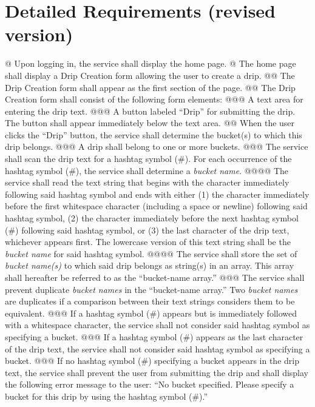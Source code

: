 \documentclass{article}
\begin{document}
\section*{Detailed Requirements (revised version)}

\begin{easylist}[articletoc]
@ Upon logging in, the service shall display the home page.
@ The home page shall display a Drip Creation form allowing the user to create a drip.
@@ The Drip Creation form shall appear as the first section of the page.
@@ The Drip Creation form shall consist of the following form elements:
@@@ A text area for entering the drip text.
@@@ A button labeled ``Drip'' for submitting the drip. The button shall appear immediately below the text area.
@@ \label{submit-drip}When the user clicks the ``Drip'' button, the service shall determine the bucket(s) to which this drip belongs.
@@@ A drip shall belong to one or more buckets.
@@@ The service shall scan the drip text for a hashtag symbol (\#). For each occurrence of the hashtag symbol (\#), the service shall determine a \textit{bucket name}.
@@@@ The service shall read the text string that begins with the character immediately following said hashtag symbol and ends with either (1) the character immediately before the first whitespace character (including a space or newline) following said hashtag symbol, (2) the character immediately before the next hashtag symbol (\#) following said hashtag symbol, or (3) the last character of the drip text, whichever appears first. The lowercase version of this text string shall be the \textit{bucket name} for said hashtag symbol.
@@@@ \label{bucket-name-array}The service shall store the set of \textit{bucket name(s)} to which said drip belongs as string(s) in an array. This array shall hereafter be referred to as the ``bucket-name array.''
@@@ The service shall prevent duplicate \textit{bucket names} in the ``bucket-name array.'' Two \textit{bucket names} are duplicates if a comparison between their text strings considers them to be equivalent.
@@@ If a hashtag symbol (\#) appears but is immediately followed with a whitespace character, the service shall not consider said hashtag symbol as specifying a bucket.
@@@ If a hashtag symbol (\#) appears as the last character of the drip text, the service shall not consider said hashtag symbol as specifying a bucket.
@@@ \label{no-bucket-error}If no hashtag symbol (\#) specifying a bucket appears in the drip text, the service shall prevent the user from submitting the drip and shall display the following error message to the user: ``No bucket specified. Please specify a bucket for this drip by using the hashtag symbol (\#).''

\end{easylist}
\end{document}
